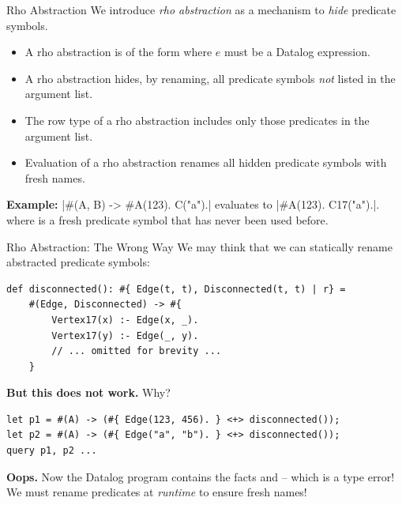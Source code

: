 \begin{frame}[fragile]{Rho Abstraction}
We introduce \emph{rho abstraction} as a mechanism to \emph{hide} predicate symbols.

\small
\begin{itemize}
    \item A rho abstraction is of the form  where $e$ must
    be a Datalog expression.
    \pause \item A rho abstraction hides, by renaming, all predicate symbols \emph{not}
    listed in the argument list. 
    \pause \item The row type of a rho abstraction includes only those predicates in
    the argument list. 
    \pause \item Evaluation of a rho abstraction renames all hidden predicate symbols
    with fresh names. 
\end{itemize}

\pause

\textbf{Example:} \Code|#(A, B) -> #{A(123). C("a").}| evaluates to \Code|#{A(123). C17("a").}|. 
where  is a fresh predicate symbol that has never been used before.
\end{frame}

\begin{frame}[fragile]{Rho Abstraction: The Wrong Way}
We may think that we can statically rename abstracted predicate symbols:

\begin{lstlisting}[language=flix, xleftmargin=0.8cm]
def disconnected(): #{ Edge(t, t), Disconnected(t, t) | r} = 
    #(Edge, Disconnected) -> #{
        Vertex17(x) :- Edge(x, _).
        Vertex17(y) :- Edge(_, y).
        // ... omitted for brevity ...
    }
\end{lstlisting}

\pause

\textbf{But this does not work.} Why?

\pause

\begin{lstlisting}[language=flix, xleftmargin=0.8cm]
let p1 = #(A) -> (#{ Edge(123, 456). } <+> disconnected());
let p2 = #(A) -> (#{ Edge("a", "b"). } <+> disconnected());
query p1, p2 ...
\end{lstlisting}

\textbf{Oops.} Now the Datalog program contains the facts 
and  -- which is a type error! We must rename predicates at
\emph{runtime} to ensure fresh names!
\end{frame}

